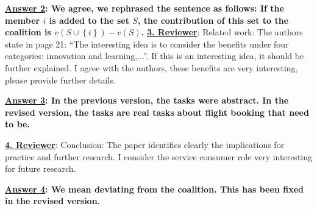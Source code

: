 \documentclass[times, 12pt,a4paper]{article}
\begin{document}
\vspace{0.2cm}\textbf{\underline{Answer 2}: We agree, we rephrased
the sentence as follows:  If the member $i$ is added to the set
$S$, the contribution of this set to the coalition is $v(S \cup
\left\{i\right\}) - v(S)$.}
\vspace{0.5cm} \textbf{\underline{3. Reviewer}}: Related work: The authors state in page 21: ``The interesting idea is to consider the benefits under four categories: innovation and learning,...''. If this is an interesting idea, it should be further explained. I agree with the authors, these benefits are very interesting, please provide further details.

\vspace{0.2cm}\textbf{\underline{Answer 3}: In the previous
version, the tasks were abstract. In the revised version, the
tasks are real tasks about flight booking that need to be.}


\vspace{0.5cm} \textbf{\underline{4. Reviewer}}:  Conclusion: The paper identifies clearly the implications for practice and further research. I consider the service consumer role very interesting for future research.

\vspace{0.2cm}\textbf{\underline{Answer 4}: We mean deviating from
the coalition. This has been fixed in the revised version.}
\end{document}
